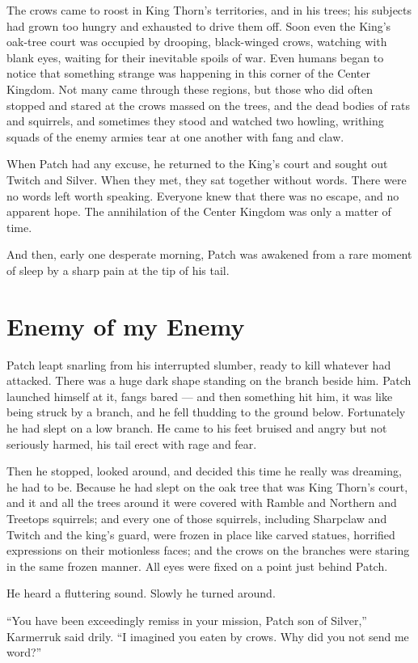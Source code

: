 \documentclass[ebook,oneside,openany,17pt]{memoir}
\newenvironment{tolerant}[1]{%
  \par\tolerance=#1\relax
}{%
  \par
}
\renewcommand{\thechapter}{\Roman{chapter}}
\newcounter{sections}
\newcommand{\sections}[1]{%
  \section*{#1}
  \addtocounter{sections}{1}%
  \pdfbookmark[1]{#1}{section.\thechapter.\thesections}}
\begin{document}
The crows came to roost in King Thorn’s territories, and in his trees;
his subjects had grown too hungry and exhausted to drive them
off. Soon even the King’s oak-tree court was occupied by drooping,
black-winged crows, watching with blank eyes, waiting for their
inevitable spoils of war. Even humans began to notice that something
strange was happening in this corner of the Center Kingdom. Not many
came through these regions, but those who did often stopped and stared
at the crows massed on the trees, and the dead bodies of rats and
squirrels, and sometimes they stood and watched two howling, writhing
squads of the enemy armies tear at one another with fang and claw.

When Patch had any excuse, he returned to the King’s court and sought
out Twitch and Silver. When they met, they sat together without
words. There were no words left worth speaking. Everyone knew that
there was no escape, and no apparent hope. The annihilation of the
Center Kingdom was only a matter of time.

And then, early one desperate morning, Patch was awakened from a rare
moment of sleep by a sharp pain at the tip of his tail.


\sections{Enemy of my Enemy}

\begin{tolerant}{500}
Patch leapt snarling from his interrupted slumber, ready to kill
whatever had attacked. There was a huge dark shape standing on the
branch beside him. Patch launched himself at it, fangs bared — and
then something hit him, it was like being struck by a branch, and he
fell thudding to the ground below. Fortunately he had slept on a low
branch. He came to his feet bruised and angry but not seriously
harmed, his tail erect with rage and fear.
\end{tolerant}

Then he stopped, looked around, and decided this time he really was
dreaming, he had to be. Because he had slept on the oak tree that was
King Thorn’s court, and it and all the trees around it were covered
with Ramble and Northern and Treetops squirrels; and every one of
those squirrels, including Sharpclaw and Twitch and the king’s guard,
were frozen in place like carved statues, horrified expressions on
their motionless faces; and the crows on the branches were staring in
the same frozen manner. All eyes were fixed on a point just behind
Patch.

He heard a fluttering sound. Slowly he turned around.

“You have been exceedingly remiss in your mission, Patch son of
Silver,” Karmerruk said drily. “I imagined you eaten by crows. Why did
you not send me word?”
\end{document}
